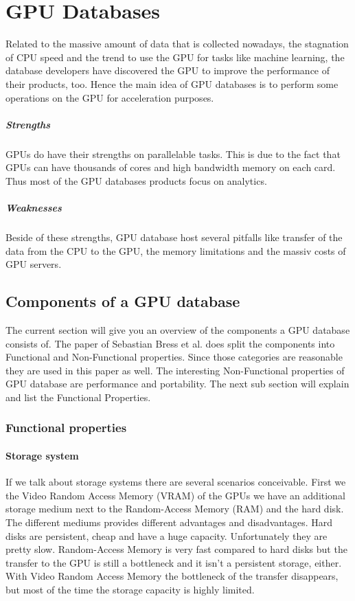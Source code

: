 \chapter{GPU Databases}
Related to the massive amount of data that is collected nowadays, the stagnation of CPU speed
and the trend to use the GPU for tasks like machine learning, the database developers have discovered the GPU to improve the performance of their products, too.
Hence the main idea of GPU databases is to perform some operations on the GPU for acceleration purposes.

\paragraph{Strengths}
GPUs do have their strengths on parallelable tasks.
This is due to the fact that GPUs can have thousands of cores and high bandwidth memory on each card.
Thus most of the GPU databases products focus on analytics.


\paragraph{Weaknesses} Beside of these strengths, GPU database host several pitfalls like transfer of the data from the CPU to the GPU,
 the memory limitations and the massiv costs of GPU servers.


\section{Components of a GPU database}
The current section will give you an overview of the components a GPU database consists of.
The paper \cite{bress2014gpu} of Sebastian Bress et al. does split the components into Functional and Non-Functional properties.
Since those categories are reasonable they are used in this paper as well.
The interesting Non-Functional properties of GPU database are performance and portability.
The next sub section will explain and list the Functional Properties.

\subsection{Functional properties}

\subsubsection{Storage system}
If we talk about storage systems there are several scenarios conceivable.
First we the Video Random Access Memory (VRAM) of the GPUs we have an additional storage medium next to the Random-Access Memory (RAM) and the hard disk.
The different mediums provides different advantages and disadvantages.
Hard disks are persistent, cheap and have a huge capacity.
Unfortunately they are pretty slow.
Random-Access Memory is very fast compared to hard disks but the transfer to the GPU is still a bottleneck and it isn't a persistent storage, either.
With Video Random Access Memory the bottleneck of the transfer disappears, but most of the time the storage capacity is highly limited.

